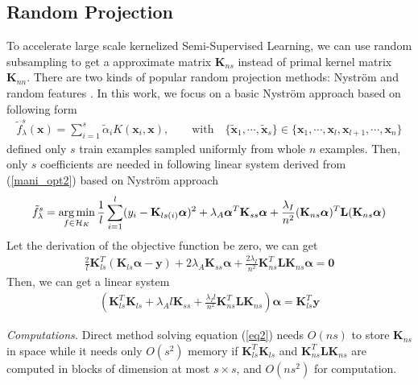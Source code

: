 \documentclass{article}
\newcommand{\argmin}{\operatornamewithlimits{arg\,min}}
\begin{document}
\subsection{Random Projection}
To accelerate large scale kernelized Semi-Supervised Learning,
we can use random subsampling to get a approximate matrix $\mathbf{K}_{ns}$
instead of primal kernel matrix $\mathbf{K}_{nn}$.
There are two kinds of popular random projection methods: Nystr\"om \cite{williams2001using,smola2000sparse}
and random features \cite{rahimi2008random}.
In this work, we focus on a basic Nystr\"om approach based on following form
\begin{align*}
    \tilde{f}^s_\lambda(\mathbf{x})=\sum_{i=1}^s \tilde{\alpha}_i K(\mathbf{x}_i, \mathbf{x}),
    \qquad
    \text{with} \quad \{\tilde{\mathbf{x}}_1, \cdots, \tilde{\mathbf{x}}_s\}
    \in \{\mathbf{x}_1, \cdots,\mathbf{x}_l, \mathbf{x}_{l+1}, \cdots, \mathbf{x}_n\}
\end{align*}
defined only $s$ train examples sampled uniformly from whole $n$ examples.
Then, only $s$ coefficients are needed in following linear system derived from (\ref{mani_opt2})
based on Nystr\"om approach
\begin{align*}
\tilde{f}^s_\lambda=\argmin \limits_{f \in \mathcal{H}_K}
\frac{1}{l} \sum_{i=1}^l (y_i-\mathbf{K}_{ls(i)}\boldsymbol{\alpha})^2
+\lambda_A \boldsymbol{\alpha}^T \mathbf{K}_{ss} \boldsymbol{\alpha}
+\frac{\lambda_I }{n^2} (\mathbf{K}_{ns}\boldsymbol{\alpha})^T\mathbf{L}(\mathbf{K}_{ns}\boldsymbol{\alpha})
\end{align*}
Let the derivation of the objective function be zero, we can get
\begin{align*}
\frac{2}{l}\mathbf{K}^T_{ls}(\mathbf{K}_{ls}\boldsymbol{\alpha}-\mathbf{y})
+2\lambda_A\mathbf{K}_{ss}\boldsymbol{\alpha}
+\frac{2\lambda_I}{n^2}\mathbf{K}_{ns}^T\mathbf{L}\mathbf{K}_{ns}\boldsymbol{\alpha}
=\mathbf{0}
\end{align*}
Then, we can get a linear system
\begin{align}\label{eq2}
(\mathbf{K}_{ls}^T\mathbf{K}_{ls}
+\lambda_A l \mathbf{K}_{ss}
+\frac{\lambda_I l}{n^2}\mathbf{K}_{ns}^T\mathbf{L}\mathbf{K}_{ns})
\boldsymbol{\alpha}=\mathbf{K}_{ls}^T\mathbf{y}
\end{align}

\emph{Computations.} Direct method solving equation (\ref{eq2}) needs $O(ns)$ to store $\mathbf{K}_{ns}$ in space
while it needs only $O(s^2)$ memory if $\mathbf{K}_{ls}^T\mathbf{K}_{ls}$
and $\mathbf{K}_{ns}^T\mathbf{L}\mathbf{K}_{ns}$ are computed in blocks of dimension at most $s \times s$,
and $O(ns^2)$ for computation.
\end{document}
